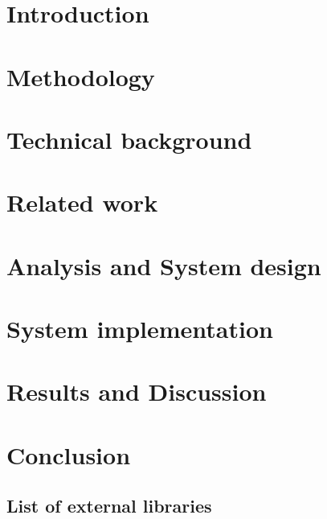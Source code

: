 \documentclass[Report.tex]{subfiles}
\begin{document}
\chapter{Introduction}
  \label{chap:intro}
  
\clearpage

\chapter{Methodology}
  \label{chap:methodology}
  
\clearpage

\chapter{Technical background}
  \label{chap:tech_background}
  
\clearpage

\chapter{Related work}
  \label{chap:similar}
  
\clearpage

\chapter{Analysis and System design}
  \label{chap:design}
  
\clearpage

\chapter{System implementation}
  \label{chap:implementation}
  
\clearpage

\chapter{Results and Discussion}
  \label{chap:discussion}
  
\clearpage

\chapter{Conclusion}
  \label{chap:conclusion}
  
\clearpage

\nocite{*} %
\printbibliography%
\clearpage

\begin{appendices}
\chapter{List of external libraries}
  \label{chap:libraries}
  
\end{appendices}
\end{document}
